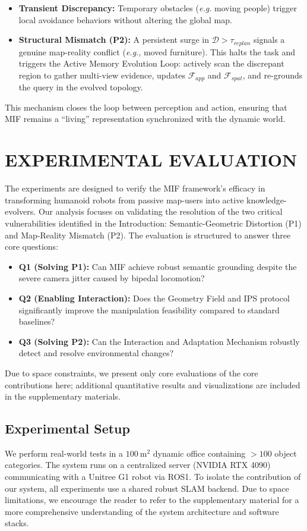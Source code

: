 \documentclass[conference]{IEEEtran}
\begin{document}
\begin{itemize}
    \item \textbf{Transient Discrepancy:} Temporary obstacles (\emph{e.g.} moving people) trigger local avoidance behaviors without altering the global map.
    \item \textbf{Structural Mismatch (P2):} A persistent surge in $\mathcal{D} > \tau_{replan}$ signals a genuine map-reality conflict (\emph{e.g.}, moved furniture). This halts the task and triggers the Active Memory Evolution Loop: actively scan the discrepant region to gather multi-view evidence, updates $\mathcal{F}_{app}$ and $\mathcal{F}_{spat}$, and re-grounds the query in the evolved topology.
\end{itemize}

This mechanism closes the loop between perception and action, ensuring that MIF remains a ``living'' representation synchronized with the dynamic world.

\section{EXPERIMENTAL EVALUATION}
\label{sec:experiments}

The experiments are designed to verify the MIF framework's efficacy in transforming humanoid robots from passive map-users into active knowledge-evolvers. Our analysis focuses on validating the resolution of the two critical vulnerabilities identified in the Introduction: Semantic-Geometric Distortion (P1) and Map-Reality Mismatch (P2). The evaluation is structured to answer three core questions:
\begin{itemize}
    \item \textbf{Q1 (Solving P1):} Can MIF achieve robust semantic grounding despite the severe camera jitter caused by bipedal locomotion?
    \item \textbf{Q2 (Enabling Interaction):} Does the Geometry Field and IPS protocol significantly improve the manipulation feasibility compared to standard baselines?
    \item \textbf{Q3 (Solving P2):} Can the Interaction and Adaptation Mechanism robustly detect and resolve environmental changes?
\end{itemize}

Due to space constraints, we present only core evaluations of the core contributions here; additional quantitative results and visualizations are included in the supplementary materials.

\subsection{Experimental Setup}
We perform real-world tests in a $100~\text{m}^2$ dynamic office containing $>100$ object categories. The system runs on a centralized server (NVIDIA RTX 4090) communicating with a Unitree G1 robot via ROS1. To isolate the contribution of our system, all experiments use a shared robust SLAM backend. Due to space limitations, we encourage the reader to refer to the supplementary material for a more comprehensive understanding of the system architecture and software stacks. 
\end{document}
